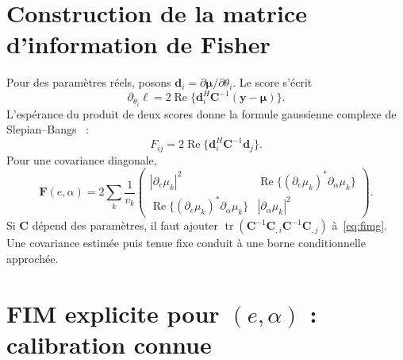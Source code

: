 \documentclass[11pt,a4paper]{article}
\newcommand{\Reel}{\operatorname{Re}}
\begin{document}
\section{Construction de la matrice d'information de Fisher}

Pour des paramètres réels, posons
$\mathbf d_i=\partial\boldsymbol\mu/\partial\theta_i$.
Le score s'écrit
\begin{equation}
 \partial_{\theta_i}\ell
 =2\Reel\{\mathbf d_i^H\mathbf C^{-1}(\mathbf y-\boldsymbol\mu)\}.
\end{equation}
L'espérance du produit de deux scores donne la formule gaussienne complexe
de Slepian--Bangs~\cite{abeida} :
\begin{equation}\label{eq:fimg}
 \boxed{F_{ij}=2\Reel\{\mathbf d_i^H\mathbf C^{-1}\mathbf d_j\}.}
\end{equation}
Pour une covariance diagonale,
\begin{equation}\label{eq:fim2}
 \boxed{\mathbf F(e,\alpha)=2\sum_k\frac{1}{v_k}
 \begin{pmatrix}
 |\partial_e\mu_k|^2 & \Reel\{(\partial_e\mu_k)^*\partial_\alpha\mu_k\}\\
 \Reel\{(\partial_e\mu_k)^*\partial_\alpha\mu_k\} & |\partial_\alpha\mu_k|^2
 \end{pmatrix}.}
\end{equation}
Si $\mathbf C$ dépend des paramètres, il faut ajouter
$\operatorname{tr}(\mathbf C^{-1}\mathbf C_{,i}\mathbf C^{-1}\mathbf C_{,j})$
à~\eqref{eq:fimg}. Une covariance estimée puis tenue fixe conduit à une
borne conditionnelle approchée.

\section{FIM explicite pour \texorpdfstring{$(e,\alpha)$}{(e, alpha)} : calibration connue}\label{sec:fermee}
\end{document}
